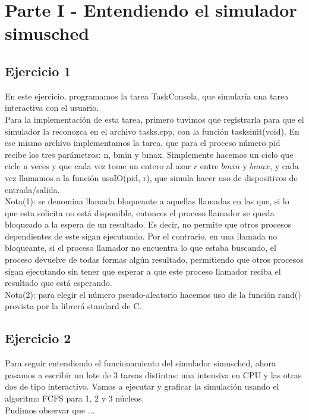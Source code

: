 \documentclass[a4paper]{article}
\begin{document}
\section{Parte I - Entendiendo el simulador simusched}

\subsection{Ejercicio 1}
En este ejercicio, programamos la tarea TaskConsola, que simular\'ia una tarea interactiva con
el usuario. \\
Para la implementaci\'on de esta tarea, primero tuvimos que registrarla para que el simulador la 
reconozca en el archivo tasks.cpp, con la funci\'on tasksinit(void). En ese mismo archivo implementamos
la tarea, que para el proceso n\'umero pid recibe los tres par\'ametros: n, bmin y bmax. Simplemente
hacemos un ciclo que cicle n veces y que cada vez tome un entero al azar $r$ entre $bmin$ y 
$bmax$, y cada vez llamamos a la funci\'on usoIO(pid, r), que simula hacer uso de dispositivos de
entrada/salida. \\
Nota(1): se denomina llamada bloqueante a aquellas llamadas en las que, si lo que esta  
solicita no est\'a disponible, entonces el proceso llamador se queda bloqueado a la espera de un
resultado. Es decir, no permite que otros procesos dependientes de este sigan ejecutando. Por 
el contrario, en una llamada no bloqueante, si el proceso llamador no encuentra lo que estaba
buscando, el proceso devuelve de todas formas alg\'un resultado, permitiendo que otros procesos
sigan ejecutando sin tener que esperar a que este proceso llamador reciba el resultado que est\'a
esperando. \\
Nota(2): para elegir el n\'umero pseudo-aleatorio hacemos uso de la funci\'on rand() provista
por la librer\'a standard de C. \\

\subsection{Ejercicio 2}
Para seguir entendiendo el funcionamiento del simulador simusched, ahora pasamos a escribir un lote
de 3 tareas distintas: una intensiva en CPU y las otras dos de tipo interactivo. Vamos a ejecutar y
graficar la simulaci\'on usando el algoritmo FCFS para 1, 2 y 3 n\'ucleos. \\
Pudimos observar que ...
\end{document}
